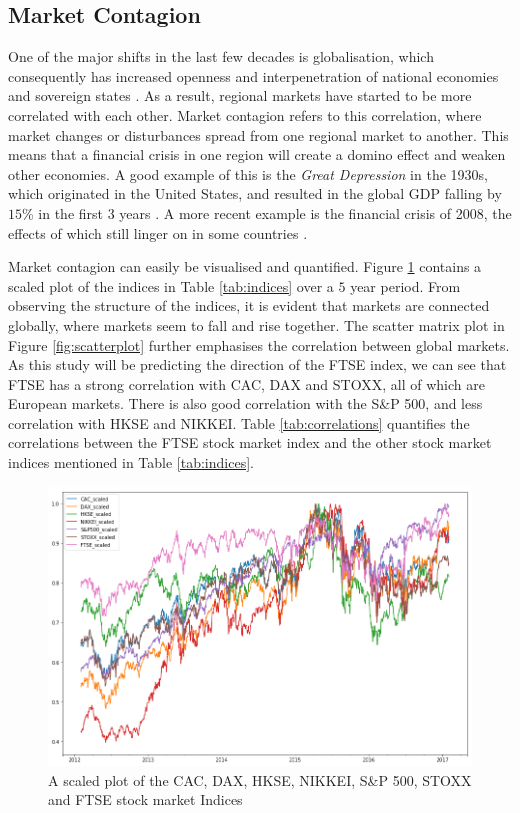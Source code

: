 \documentclass{UoYCSproject}
\begin{document}
\subsection{Market Contagion}
One of the major shifts in the last few decades is globalisation, which consequently has increased openness and interpenetration of national economies and sovereign states \cite{scott1999regions}. As a result, regional markets have started to be more correlated with each other. Market contagion refers to this correlation, where market changes or disturbances spread from one regional market to another. This means that a financial crisis in one region will create a domino effect and weaken other economies. A good example of this is the \textit{Great Depression} in the 1930s, which originated in the United States, and resulted in the global GDP falling by $15$\% in the first $3$ years \cite{rogerhistoryrepeating}. A more recent example is the financial crisis of 2008, the effects of which still linger on in some countries \cite{2008crisis}.  

Market contagion can easily be visualised and quantified. Figure \ref{fig:stockindexplot} contains a scaled plot of the indices in Table \ref{tab:indices} over a $5$ year period. From observing the structure of the indices, it is evident that markets are connected globally, where markets seem to fall and rise together. The scatter matrix plot in Figure \ref{fig:scatterplot} further emphasises the correlation between global markets. As this study will be predicting the direction of the FTSE index, we can see that FTSE has a strong correlation with CAC, DAX and STOXX, all of which are European markets. There is also good correlation with the S\&P 500, and less correlation with HKSE and NIKKEI. Table \ref{tab:correlations} quantifies the correlations between the FTSE stock market index and the other stock market indices mentioned in Table \ref{tab:indices}. 

\begin{figure}[h]
\includegraphics[width=12cm]{scaled_plot_of_indices}
\centering
\caption{A scaled plot of the CAC, DAX, HKSE, NIKKEI, S\&P 500, STOXX and FTSE stock market Indices} 
\label{fig:stockindexplot}
\end{figure}
\end{document}
